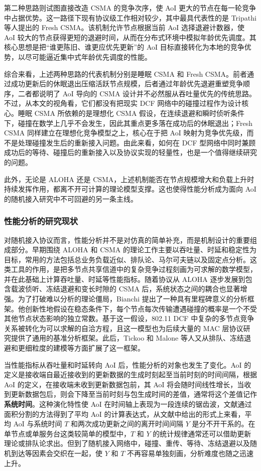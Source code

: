 第二种思路则试图直接改造 CSMA 的竞争次序，使 AoI 更大的节点在每一轮竞争中占据优势。这一路径下现有协议级工作相对较少，其中最具代表性的是 Tripathi 等人提出的 Fresh CSMA\cite{tripathi2023fresh}。该机制允许节点根据当前 AoI 选择退避计数器，使 AoI 较大的节点获得更短的退避时间，从而在分布式环境中模拟年龄优先调度。其核心思想是把“谁更陈旧、谁更应优先更新”的 AoI 目标直接转化为本地的竞争优势，以尽可能逼近集中式年龄优先调度的性能。

综合来看，上述两种思路的代表机制分别是睡眠 CSMA 和 Fresh CSMA。前者通过成功更新后的休眠退出压缩活跃节点规模，后者通过年龄优先退避重塑竞争顺序，二者都说明了 AoI 导向的 CSMA 设计并不必然服从吞吐量优先的传统思路。不过，从本文的视角看，它们都没有把现实 DCF 网络中的碰撞过程作为设计核心。睡眠 CSMA 所依赖的是理想化 CSMA 假设，在连续退避和瞬时侦听条件下，碰撞在数学上几乎不会发生，因此其重点更多落在成功后的休眠退出；Fresh CSMA 同样建立在理想化竞争模型之上，核心在于把 AoI 映射为竞争优先级，而不是处理碰撞发生后的重新接入问题。由此来看，如何在 DCF 型网络中同时兼顾成功后的等待、碰撞后的重新接入以及协议实现的轻量性，也是一个值得继续研究的问题。

此外，无论是 ALOHA 还是 CSMA，上述机制能否在节点规模增大和负载上升时持续发挥作用，都离不开可计算的理论模型支撑。这也使得性能分析成为面向 AoI 的随机接入研究中不可回避的另一条主线。

\subsubsection{性能分析的研究现状}

对随机接入协议而言，性能分析并不是对仿真的简单补充，而是机制设计的重要组成部分。早期围绕 ALOHA 和 CSMA 的理论工作主要以吞吐量、时延和稳定性为目标，常用的方法包括总业务负载近似、排队论、马尔可夫链以及固定点分析。这类工具的作用，是把多节点共享信道中的复杂竞争过程刻画为可求解的数学模型，并在此基础上计算吞吐量、时延等性能指标。随着协议从 ALOHA 逐步发展到包含载波侦听、冻结退避和变长时隙的 CSMA 后，系统状态之间的耦合也显著增强。为了打破难以分析的理论僵局，Bianchi 提出了一种具有里程碑意义的分析框架\cite{bianchi2002performance}。他创新性地假设在稳态条件下，每个节点每次传输遭遇碰撞的概率是一个不受其他节点状态影响的独立常数。基于这一假设，802.11 DCF 中复杂的多节点竞争关系被转化为可以求解的自洽方程，且这一模型也为后续大量的 MAC 层协议研究提供了通用的基准分析框架。此后，Tickoo 和 Malone 等人又从排队、冻结退避和更细粒度的建模等方面扩展了这一框架\cite{tickoo2004queueing,malone2007modeling}。

当性能指标从吞吐量和时延转向 AoI 后，性能分析的对象也发生了变化。AoI 的定义是接收端自最近接收到的更新数据的生成时刻起至当前时刻的时间间隔，根据 AoI 的定义，在接收端未收到更新数据包前，其 AoI 将会随时间线性增长，当收到更新数据包后，则会下降至当前时刻与包生成时间的差值，通常将这个差值记作\textbf{系统时间}。这种演化特性使 AoI 在时间轴上表现为一段连续的锯齿波，文献\cite{costa2016age}通过面积分割的方法得到了平均 AoI 的计算表达式，从文献中给出的形式上来看，平均 AoI 与系统时间 $T$ 和两次成功更新之间的离开时间间隔 $Y$ 是分不开干系的。在单节点或单服务台这类较简单的模型中，$T$ 和 $Y$ 的统计规律通常还可以借助更新理论或排队论求出。但到了随机接入网络中，碰撞、重传、等待、冻结退避以及随机到达等因素会交织在一起，使 $Y$ 和 $T$ 不再容易单独刻画，分析难度也随之迅速上升。

